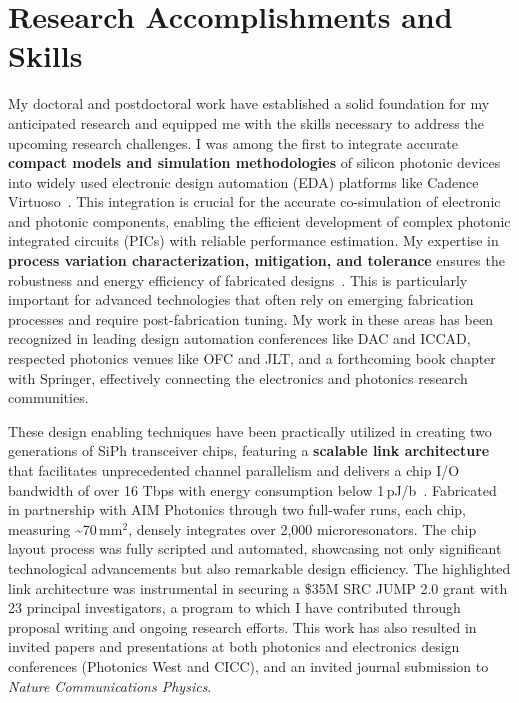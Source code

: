 \section{Research Accomplishments and Skills}
My doctoral and postdoctoral work have established a solid foundation for my anticipated research and equipped me with the skills necessary to address the upcoming research challenges. I was among the first to integrate accurate \textbf{compact models and simulation methodologies} of silicon photonic devices into widely used electronic design automation (EDA) platforms like Cadence Virtuoso~\cite{wuCompactModelingCircuitlevel2017,zhangCompactModelingSilicon2017}. This integration is crucial for the accurate co-simulation of electronic and photonic components, enabling the efficient development of complex photonic integrated circuits (PICs) with reliable performance estimation. My expertise in \textbf{process variation characterization, mitigation, and tolerance} ensures the robustness and energy efficiency of fabricated designs~\cite{wangCharacterizationApplicationsSpatial2020,wangEnergyEfficiencyYield2021,wangDispersionEngineeredFabricationRobustSOI2023}. This is particularly important for advanced technologies that often rely on emerging fabrication processes and require post-fabrication tuning. My work in these areas has been recognized in leading design automation conferences like DAC and ICCAD, respected photonics venues like OFC and JLT, and a forthcoming book chapter with Springer, effectively connecting the electronics and photonics research communities.

These design enabling techniques have been practically utilized in creating two generations of SiPh transceiver chips, featuring a \textbf{scalable link architecture} that facilitates unprecedented channel parallelism and delivers a chip I/O bandwidth of over 16 Tbps with energy consumption below 1\,pJ/b~\cite{wangScalableArchitectureSubpJ2023,wangCICC2024}. Fabricated in partnership with AIM Photonics through two full-wafer runs, each chip, measuring \textasciitilde{}70\,mm$^\text{2}$, densely integrates over 2,000 microresonators. The chip layout process was fully scripted and automated, showcasing not only significant technological advancements but also remarkable design efficiency. The highlighted link architecture was instrumental in securing a \$35M SRC JUMP 2.0 grant with 23 principal investigators, a program to which I have contributed through proposal writing and ongoing research efforts. This work has also resulted in invited papers and presentations at both photonics and electronics design conferences (Photonics West and CICC), and an invited journal submission to \emph{Nature Communications Physics}.

